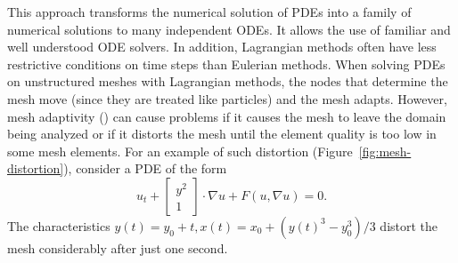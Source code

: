This approach transforms the numerical solution of PDEs into a family of
numerical solutions to many independent ODEs. It allows the use of familiar
and well understood ODE solvers. In addition, Lagrangian methods often
have less restrictive conditions on time steps than Eulerian methods.
When solving PDEs on unstructured meshes
with Lagrangian methods, the nodes that determine the mesh move (since they
are treated like particles) and the mesh adapts. However, mesh adaptivity
(\cite{Dukowicz1987, Jiao2004, Babuska1978})
can cause problems if it causes the mesh to leave the domain being
analyzed or if it distorts the mesh until the element quality is too low
in some mesh elements.
For an example of such distortion (Figure~\ref{fig:mesh-distortion}),
consider a PDE of the form
\begin{equation}
u_t + \left[ \begin{array}{c} y^2 \\ 1 \end{array}\right] \cdot \nabla u +
  F\left(u, \nabla u\right) = 0.
\end{equation}
The characteristics \(y(t) = y_0 + t, x(t) = x_0 +
\left(y(t)^3 - y_0^3\right)/3\)
distort the mesh considerably after just one second.






